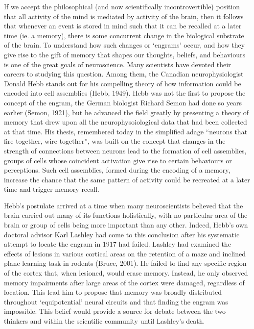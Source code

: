 \documentclass[12pt,a4paperpaper,]{report}
\begin{document}
If we accept the philosophical (and now scientifically incontrovertible)
position that all activity of the mind is mediated by activity of the
brain, then it follows that whenever an event is stored in mind such
that it can be recalled at a later time (ie. a memory), there is some
concurrent change in the biological substrate of the brain. To
understand how such changes or `engrams' occur, and how they give rise
to the gift of memory that shapes our thoughts, beliefs, and behaviours
is one of the great goals of neuroscience. Many scientists have devoted
their careers to studying this question. Among them, the Canadian
neurophysiologist Donald Hebb stands out for his compelling theory of
how information could be encoded into cell assemblies (Hebb, 1949). Hebb
was not the first to propose the concept of the engram, the German
biologist Richard Semon had done so years earlier (Semon, 1921), but he
advanced the field greatly by presenting a theory of memory that drew
upon all the neurophysoiological data that had been collected at that
time. His thesis, remembered today in the simplified adage ``neurons
that fire together, wire together'', was built on the concept that
changes in the strength of connections between neurons lead to the
formation of cell assemblies, groups of cells whose coincident
activation give rise to certain behaviours or perceptions. Such cell
assemblies, formed during the encoding of a memory, increase the chance
that the same pattern of activity could be recreated at a later time and
trigger memory recall.

Hebb's postulate arrived at a time when many neuroscientists believed
that the brain carried out many of its functions holistically, with no
particular area of the brain or group of cells being more important than
any other. Indeed, Hebb's own doctoral advisor Karl Lashley had come to
this conclusion after his systematic attempt to locate the engram in
1917 had failed. Lashley had examined the effects of lesions in various
cortical areas on the retention of a maze and inclined plane learning
task in rodents (Bruce, 2001). He failed to find any specific region of
the cortex that, when lesioned, would erase memory. Instead, he only
observed memory impairments after large areas of the cortex were
damaged, regardless of location. This lead him to propose that memory
was broadly distributed throughout `equipotential' neural circuits and
that finding the engram was impossible. This belief would provide a
source for debate between the two thinkers and within the scientific
community until Lashley's death.
\end{document}
